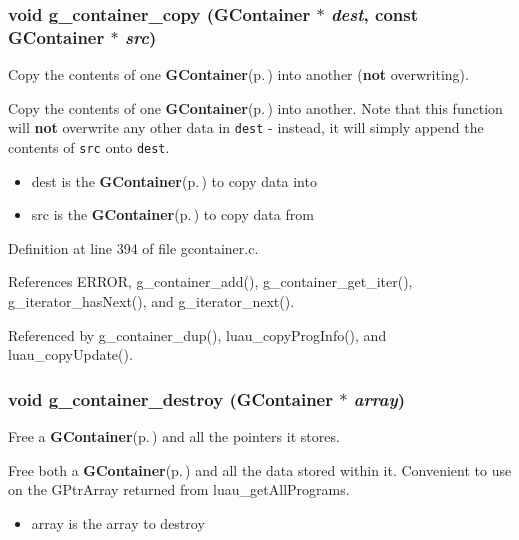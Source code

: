 \subsubsection{\setlength{\rightskip}{0pt plus 5cm}void g\_\-container\_\-copy ({\bf GContainer} $\ast$ {\em dest}, const {\bf GContainer} $\ast$ {\em src})}\label{gcontainer_8h_a21}


Copy the contents of one {\bf GContainer}{\rm (p.\,\pageref{structGContainer})} into another ({\bf not} overwriting). 

Copy the contents of one {\bf GContainer}{\rm (p.\,\pageref{structGContainer})} into another. Note that this function will {\bf not} overwrite any other data in {\tt dest} - instead, it will simply append the contents of {\tt src} onto {\tt dest}.

\begin{itemize}
\item dest is the {\bf GContainer}{\rm (p.\,\pageref{structGContainer})} to copy data into \item src is the {\bf GContainer}{\rm (p.\,\pageref{structGContainer})} to copy data from \end{itemize}


Definition at line 394 of file gcontainer.c.

References ERROR, g\_\-container\_\-add(), g\_\-container\_\-get\_\-iter(), g\_\-iterator\_\-has\-Next(), and g\_\-iterator\_\-next().

Referenced by g\_\-container\_\-dup(), luau\_\-copy\-Prog\-Info(), and luau\_\-copy\-Update().
\subsubsection{\setlength{\rightskip}{0pt plus 5cm}void g\_\-container\_\-destroy ({\bf GContainer} $\ast$ {\em array})}\label{gcontainer_8h_a23}


Free a {\bf GContainer}{\rm (p.\,\pageref{structGContainer})} and all the pointers it stores. 

Free both a {\bf GContainer}{\rm (p.\,\pageref{structGContainer})} and all the data stored within it. Convenient to use on the GPtr\-Array returned from luau\_\-get\-All\-Programs.

\begin{itemize}
\item array is the array to destroy \end{itemize}


